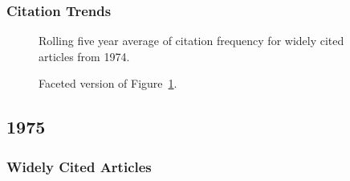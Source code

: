 \documentclass[
  10pt,
  letterpaper,
  DIV=11,
  numbers=noendperiod,
  twoside]{scrartcl}
\begin{document}
\subsubsection*{Citation Trends}\label{sec-trends-1974}

\begin{figure}


\caption{\label{fig-citation-spaghetti-1974}Rolling five year average of
citation frequency for widely cited articles from 1974.}

\end{figure}%

\begin{figure}


\caption{\label{fig-citation-facet-1974}Faceted version of
Figure~\ref{fig-citation-spaghetti-1974}.}

\end{figure}%

\newpage

\subsection{1975}\label{sec-s1975}

\subsubsection*{Widely Cited Articles}\label{widely-cited-articles-19}
\end{document}

